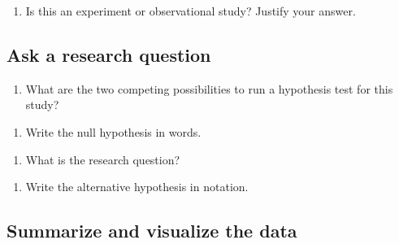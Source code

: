 \documentclass[
]{report}
\providecommand{\tightlist}{%
  \setlength{\itemsep}{0pt}\setlength{\parskip}{0pt}}
\begin{document}
\vspace{1in}

\begin{enumerate}
\def\labelenumi{\arabic{enumi}.}
\setcounter{enumi}{3}
\tightlist
\item
  Is this an experiment or observational study? Justify your answer.
\end{enumerate}

\vspace{0.3in}

\hypertarget{ask-a-research-question}{%
\subsection*{Ask a research question}\label{ask-a-research-question}}

\begin{enumerate}
\def\labelenumi{\arabic{enumi}.}
\setcounter{enumi}{4}
\tightlist
\item
  What are the two competing possibilities to run a hypothesis test for this study?
\end{enumerate}

\vspace{1in}

\begin{enumerate}
\def\labelenumi{\arabic{enumi}.}
\setcounter{enumi}{5}
\tightlist
\item
  Write the null hypothesis in words.
\end{enumerate}

\vspace{1in}

\begin{enumerate}
\def\labelenumi{\arabic{enumi}.}
\setcounter{enumi}{6}
\tightlist
\item
  What is the research question?
\end{enumerate}

\vspace{1in}

\begin{enumerate}
\def\labelenumi{\arabic{enumi}.}
\setcounter{enumi}{7}
\tightlist
\item
  Write the alternative hypothesis in notation.
\end{enumerate}

\vspace{1in}

\newpage

\hypertarget{summarize-and-visualize-the-data}{%
\subsection*{Summarize and visualize the data}\label{summarize-and-visualize-the-data}}
\end{document}
